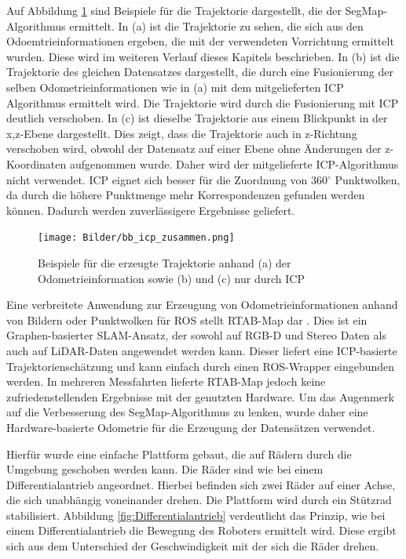 Auf Abbildung \ref{fig:ICP} sind Beispiele für die Trajektorie dargestellt, die der SegMap-Algorithmus ermittelt. In (a) ist die Trajektorie zu sehen, die sich aus den Odoemtrieinformationen ergeben, die mit der verwendeten Vorrichtung ermittelt wurden. Diese wird im weiteren Verlauf dieses Kapitels beschrieben. In (b) ist die Trajektorie des gleichen Datensatzes dargestellt, die durch eine Fusionierung der selben Odometrieinformationen wie in (a) mit dem mitgelieferten ICP Algorithmus ermittelt wird. Die Trajektorie wird durch die Fusionierung mit ICP deutlich verschoben. In (c) ist dieselbe Trajektorie aus einem Blickpunkt in der x,z-Ebene dargestellt. Dies zeigt, dass die Trajektorie auch in z-Richtung verschoben wird, obwohl der Datensatz auf einer Ebene ohne Änderungen der z-Koordinaten aufgenommen wurde. Daher wird der mitgelieferte ICP-Algorithmus nicht verwendet. ICP eignet sich besser für die Zuordnung von 360$^\circ$ Punktwolken, da durch die höhere Punktmenge mehr Korrespondenzen gefunden werden können. Dadurch werden zuverlässigere Ergebnisse geliefert.

\begin{figure}
	\centering
	\texttt{[image: Bilder/bb\_icp\_zusammen.png]}
	\caption{Beispiele für die erzeugte Trajektorie anhand (a) der Odometrieinformation sowie (b) und (c) nur durch ICP}
	\label{fig:ICP}
\end{figure}

Eine verbreitete Anwendung zur Erzeugung von Odometrieinformationen anhand von Bildern oder Punktwolken für ROS stellt RTAB-Map dar \cite{Labbe2019}. Dies ist ein Graphen-basierter SLAM-Ansatz, der sowohl auf RGB-D und Stereo Daten als auch auf LiDAR-Daten angewendet werden kann. Dieser liefert eine ICP-basierte Trajektorienschätzung und kann einfach durch einen ROS-Wrapper eingebunden werden. In mehreren Messfahrten lieferte RTAB-Map jedoch keine zufriedenstellenden Ergebnisse mit der genutzten Hardware. Um das Augenmerk auf die Verbesserung des SegMap-Algorithmus zu lenken, wurde daher eine Hardware-basierte Odometrie für die Erzeugung der Datensätzen verwendet. 

Hierfür wurde eine einfache Plattform gebaut, die auf Rädern durch die Umgebung geschoben werden kann. Die Räder sind wie bei einem Differentialantrieb angeordnet. Hierbei befinden sich zwei Räder auf einer Achse, die sich unabhängig voneinander drehen. Die Plattform wird durch ein Stützrad stabilisiert. Abbildung \ref{fig:Differentialantrieb} verdeutlicht das Prinzip, wie bei einem Differentialantrieb die Bewegung des Roboters ermittelt wird. Diese ergibt sich aus dem Unterschied der Geschwindigkeit mit der sich die Räder drehen. 

